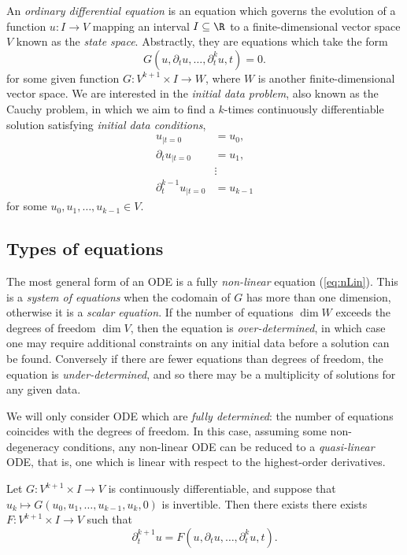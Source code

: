 An \emph{ordinary differential equation} is an equation which governs the evolution of a function $u : I \to V$ mapping an interval $I \subseteq \R$ to a finite-dimensional vector space $V$ known as the \emph{state space}. Abstractly, they are equations which take the form 
	\begin{equation}
		G(u, \partial_t u, \dots, \partial_t^k u, t) = 0.
		\tag{nLin}
		\label{eq:nLin}
	\end{equation}	
for some given function $G : V^{k + 1} \times I \to W$, where $W$ is another finite-dimensional vector space. We are interested in the \emph{initial data problem}, also known as the Cauchy problem, in which we aim to find a $k$-times continuously differentiable solution satisfying \emph{initial data conditions},
	\begin{align*}
		u_{|t = 0}
			&= u_0, \\
		\partial_t u_{|t = 0}
			&= u_1,\\
			&\vdots \\
		\partial_t^{k - 1} u_{|t = 0}	
			&= u_{k - 1}	
	\end{align*}
for some $u_0, u_1, \dots, u_{k - 1} \in V$. 	

\subsection{Types of equations}

The most general form of an ODE is a fully \emph{non-linear} equation (\ref{eq:nLin}). This is a \emph{system of equations} when the codomain of $G$ has more than one dimension, otherwise it is a \emph{scalar equation}. If the number of equations $\dim W$ exceeds the degrees of freedom $\dim V$, then the equation is \emph{over-determined}, in which case one may require additional constraints on any initial data before a solution can be found. Conversely if there are fewer equations than degrees of freedom, the equation is \emph{under-determined}, and so there may be a multiplicity of solutions for any given data. 

We will only consider ODE which are \emph{fully determined}: the number of equations coincides with the degrees of freedom. In this case, assuming some non-degeneracy conditions, any non-linear ODE can be reduced to a \emph{quasi-linear} ODE, that is, one which is linear with respect to the highest-order derivatives. 

\begin{proposition}
	Let $G : V^{k + 1} \times I \to V$ is continuously differentiable, and suppose that $u_k \mapsto G(u_0, u_1, \dots, u_{k - 1}, u_k, 0)$ is invertible. Then there exists there exists $F: V^{k + 1} \times I \to V$ such that
		\begin{equation}
			 \partial_t^{k + 1} u = F(u, \partial_t u, \dots, \partial_t^{k} u, t).\tag{qLin}\label{eq:qLin}
		\end{equation}	
\end{proposition}


